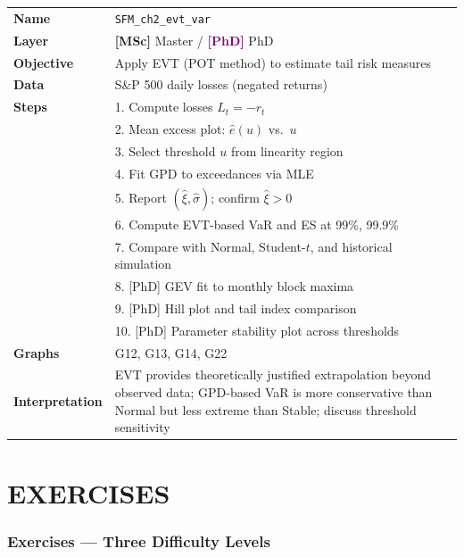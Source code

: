 \documentclass[11pt, a4paper]{article}
\newcommand{\layerM}[1]{\textcolor{Forest}{\textbf{[MSc]}} #1}
\newcommand{\layerP}[1]{\textcolor{Purple}{\textbf{[PhD]}} #1}
\theoremstyle{definition}
\begin{document}
\begin{tabular}{l p{12cm}}
\toprule
\textbf{Name} & \texttt{SFM\_ch2\_evt\_var} \\
\textbf{Layer} & \layerM{Master} / \layerP{PhD} \\
\textbf{Objective} & Apply EVT (POT method) to estimate tail risk measures \\
\textbf{Data} & S\&P 500 daily losses (negated returns) \\
\textbf{Steps} &
  1. Compute losses $L_t = -r_t$ \\
  & 2. Mean excess plot: $\hat{e}(u)$ vs.\ $u$ \\
  & 3. Select threshold $u$ from linearity region \\
  & 4. Fit GPD to exceedances via MLE \\
  & 5. Report $(\hat{\xi}, \hat{\sigma})$; confirm $\hat{\xi} > 0$ \\
  & 6. Compute EVT-based VaR and ES at 99\%, 99.9\% \\
  & 7. Compare with Normal, Student-$t$, and historical simulation \\
  & 8. [PhD] GEV fit to monthly block maxima \\
  & 9. [PhD] Hill plot and tail index comparison \\
  & 10. [PhD] Parameter stability plot across thresholds \\
\textbf{Graphs} & G12, G13, G14, G22 \\
\textbf{Interpretation} & EVT provides theoretically justified extrapolation beyond observed data; GPD-based VaR is more conservative than Normal but less extreme than Stable; discuss threshold sensitivity \\
\bottomrule
\end{tabular}


\part{EXERCISES}

\section{Exercises — Three Difficulty Levels}
\end{document}

